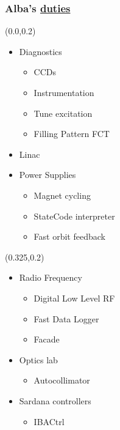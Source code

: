 \documentclass{beamer}
\begin{document}
\begin{frame}
\frametitle{Alba's \href{https://www.cells.es/Members/sblanch}{duties}}
    \begin{textblock*}{40mm}(0.0\textwidth,0.2\textheight)
        \begin{itemize}
            \item Diagnostics
            \begin{itemize}
                \item<alert@1> CCDs
                \item Instrumentation
                \item Tune excitation
                \item Filling Pattern FCT
            \end{itemize}
            \item<alert@1> Linac
            \item Power Supplies
            \begin{itemize}
                \item Magnet cycling
                \item StateCode interpreter
                \item<alert@1> Fast orbit feedback
            \end{itemize}
        \end{itemize}
    \end{textblock*}
    \begin{textblock*}{45mm}(0.325\textwidth,0.2\textheight)
        \begin{itemize}
            \item Radio Frequency
            \begin{itemize}
                \item Digital Low Level RF
                \item<alert@1> Fast Data Logger
                \item Facade
            \end{itemize}
            \item Optics lab
            \begin{itemize}
                \item Autocollimator
            \end{itemize}
            \item Sardana controllers
            \begin{itemize}
                \item IBACtrl

\end{itemize}
\end{itemize}
\end{textblock*}
\end{frame}
\end{document}
